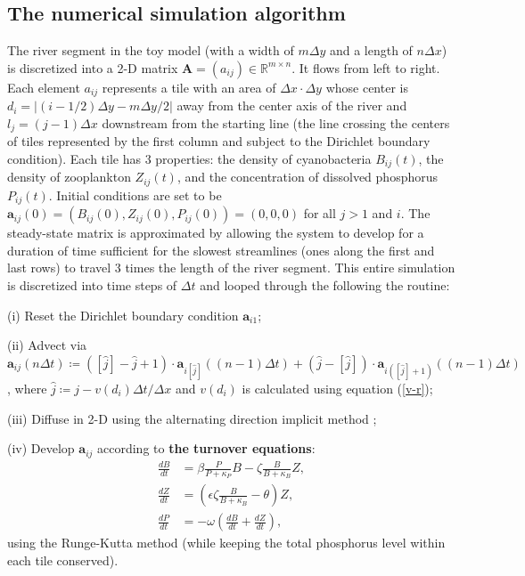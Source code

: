\documentclass{article}
\renewcommand\vec{\mathbf}
\begin{document}
\subsection*{The numerical simulation algorithm}

The river segment in the toy model (with a width of $m\Delta y$ and a length of $n\Delta x$) is discretized into a 2-D matrix $\vec{A} = (a_{ij}) \in \mathbb{R}^{m \times n}$. It flows from left to right. Each element $a_{ij}$ represents a tile with an area of $\Delta x \cdot \Delta y$ whose center is $d_i = |(i - 1/2)\Delta y - m\Delta y/2|$ away from the center axis of the river and $l_j = (j - 1)\Delta x$ downstream from the starting line (the line crossing the centers of tiles represented by the first column and subject to the Dirichlet boundary condition). Each tile has 3 properties: the density of cyanobacteria $B_{ij}(t)$, the density of zooplankton $Z_{ij}(t)$, and the concentration of dissolved phosphorus $P_{ij}(t)$. Initial conditions are set to be $\vec{a}_{ij}(0) = (B_{ij}(0), Z_{ij}(0), P_{ij}(0)) = (0, 0, 0)$ for all $j > 1$ and $i$. The steady-state matrix is approximated by allowing the system to develop for a duration of time sufficient for the slowest streamlines (ones along the first and last rows) to travel 3 times the length of the river segment. This entire simulation is discretized into time steps of $\Delta t$ and looped through the following the routine:

(i) Reset the Dirichlet boundary condition $\vec{a}_{i1}$;

(ii) Advect via $\vec{a}_{ij}(n\Delta t) \coloneqq ([\hat{j}] - \hat{j} + 1) \cdot \vec{a}_{i[\hat{j}]}((n - 1)\Delta t) + (\hat{j} - [\hat{j}]) \cdot \vec{a}_{i([\hat{j}] + 1)}((n - 1)\Delta t)$, where $\hat{j} \coloneqq j - v(d_i)\Delta t/\Delta x$ and $v(d_i)$ is calculated using equation (\ref{v-r});

(iii) Diffuse in 2-D using the alternating direction implicit method \cite{ADI};

(iv) Develop $\vec{a}_{ij}$ according to \textbf{the turnover equations}:
\begin{align*}
    \frac{d B}{d t} &= \beta\frac{P}{P + \kappa_P}B - \zeta\frac{B}{B + \kappa_B}Z,\\
    \frac{d Z}{d t} &= (\epsilon\zeta\frac{B}{B + \kappa_B} - \theta) Z,\\
    \frac{d P}{d t} &= -\omega(\frac{d B}{d t} + \frac{d Z}{d t}),
\end{align*}
using the Runge-Kutta method (while keeping the total phosphorus level within each tile conserved).
\end{document}
